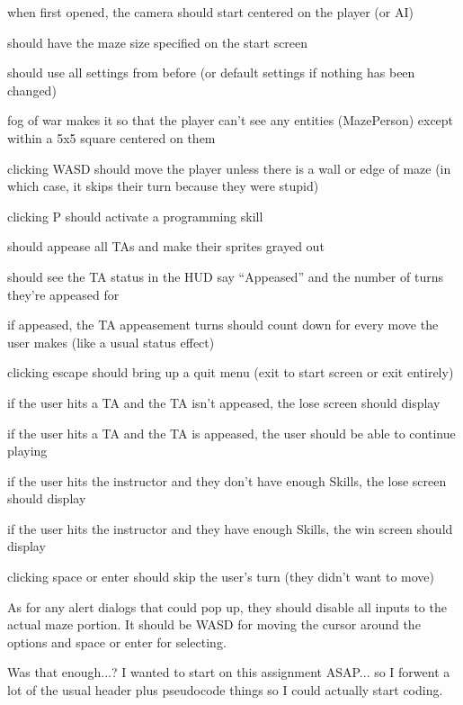 \documentclass[11pt]{article} %
\begin{document}
\begin{compactitem}
	\item when first opened, the camera should start centered on the player (or AI)
	\item should have the maze size specified on the start screen 
	\item should use all settings from before (or default settings if nothing has been changed)
	\item fog of war makes it so that the player can't see any entities (MazePerson) except within a 5x5 square centered on them
	\item clicking WASD should move the player unless there is a wall or edge of maze (in which case, it skips their turn because they were stupid)
	\item clicking P should activate a programming skill
	\begin{compactitem}
		\item should appease all TAs and make their sprites grayed out 
		\item should see the TA status in the HUD say ``Appeased'' and the number of turns they're appeased for
	\end{compactitem}
	\item if appeased, the TA appeasement turns should count down for every move the user makes (like a usual status effect)
	\item clicking escape should bring up a quit menu (exit to start screen or exit entirely)
	\item if the user hits a TA and the TA isn't appeased, the lose screen should display 
	\item if the user hits a TA and the TA is appeased, the user should be able to continue playing
	\item if the user hits the instructor and they don't have enough Skills, the lose screen should display
	\item if the user hits the instructor and they have enough Skills, the win screen should display
	\item clicking space or enter should skip the user's turn (they didn't want to move)
\end{compactitem} 

As for any alert dialogs that could pop up, they should disable all inputs to the actual maze portion. It should be WASD for moving the cursor around the options and space or enter for selecting. 

\bigbreak\bigbreak\bigbreak\noindent
Was that enough...? I wanted to start on this assignment ASAP... so I forwent a lot of the usual header plus pseudocode things so I could actually start coding.
\end{document}
